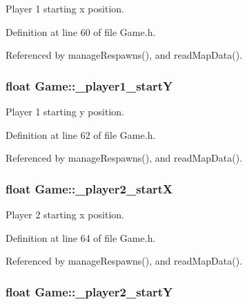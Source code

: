 Player 1 starting x position. 



Definition at line 60 of file Game.\-h.



Referenced by manage\-Respawns(), and read\-Map\-Data().

\hypertarget{classGame_ac86e7845910feac197a8396c9eedcae9}{
\subsubsection[{\-\_\-player1\-\_\-start\-Y}]{\setlength{\rightskip}{0pt plus 5cm}float Game\-::\-\_\-player1\-\_\-start\-Y\hspace{0.3cm}{\ttfamily [private]}}}\label{classGame_ac86e7845910feac197a8396c9eedcae9}


Player 1 starting y position. 



Definition at line 62 of file Game.\-h.



Referenced by manage\-Respawns(), and read\-Map\-Data().

\hypertarget{classGame_ac3fb65efc81597149ea1c6951110f1b8}{
\subsubsection[{\-\_\-player2\-\_\-start\-X}]{\setlength{\rightskip}{0pt plus 5cm}float Game\-::\-\_\-player2\-\_\-start\-X\hspace{0.3cm}{\ttfamily [private]}}}\label{classGame_ac3fb65efc81597149ea1c6951110f1b8}


Player 2 starting x position. 



Definition at line 64 of file Game.\-h.



Referenced by manage\-Respawns(), and read\-Map\-Data().

\hypertarget{classGame_a62232949f4969880bad54622e180d9aa}{
\subsubsection[{\-\_\-player2\-\_\-start\-Y}]{\setlength{\rightskip}{0pt plus 5cm}float Game\-::\-\_\-player2\-\_\-start\-Y\hspace{0.3cm}{\ttfamily [private]}}}\label{classGame_a62232949f4969880bad54622e180d9aa}


